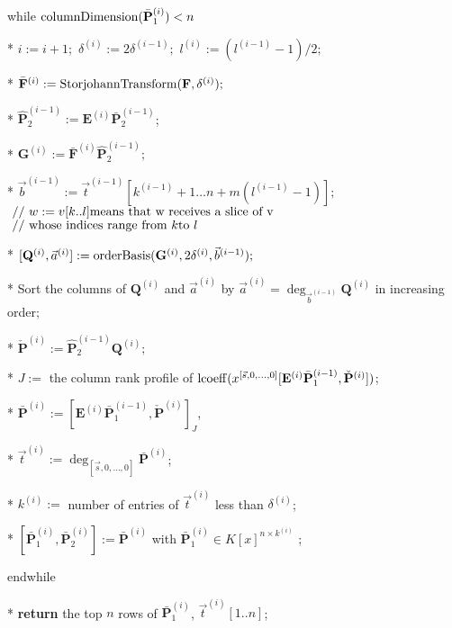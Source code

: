 \begin{algorithm}[t]
\begin{algor}[1]
\item [{{while}}] $\columnDimension(\bar{\mathbf{P}}_{1}^{\left(i\right)})<n$ 
\item [{{{*}}}] $i:=i+1;$ $\delta^{\left(i\right)}:=2\delta^{\left(i-1\right)};$
$l^{\left(i\right)}:=(l^{\left(i-1\right)}-1)/2;$ 
\item [{{{*}}}] $\bar{\mathbf{F}}^{\left(i\right)}:=\StorjohannTransform(\mathbf{F},\delta^{\left(i\right)});$ 
\item [{{{*}}}] $\hat{\mathbf{P}}_{2}^{\left(i-1\right)}:=\mathbf{E}^{\left(i\right)}\bar{\mathbf{P}}_{2}^{\left(i-1\right)}$;
\item [{{{*}}}] \label{line:matrixProduct1}$\mathbf{G}^{\left(i\right)}:=\bar{\mathbf{F}}^{\left(i\right)}\hat{\mathbf{P}}_{2}^{\left(i-1\right)};$ 
\item [{{{*}}}] $\vec{b}^{\left(i-1\right)}:=\vec{t}^{\left(i-1\right)}[k^{\left(i-1\right)}+1\dots n+m(l^{\left(i-1\right)}-1)];$
\\
$\mbox{ // \ensuremath{w:=v[k..l]}means that w receives a slice of v }$\\
$\mbox{ // whose indices range from \ensuremath{k}to \ensuremath{l}}$
\item [{{{*}}}] \label{line:orderBasisComputation}$[\mathbf{Q}^{\left(i\right)},\vec{a}^{\left(i\right)}]:=\mab(\mathbf{G}^{\left(i\right)},2\delta^{\left(i\right)},\vec{b}^{\left(i-1\right)});$ 
\item [{{{*}}}] Sort the columns of $\mathbf{Q}^{\left(i\right)}$ and
$\vec{a}^{\left(i\right)}$ by $\vec{a}^{\left(i\right)}=\deg_{\vec{b}^{\left(i-1\right)}}\mathbf{Q}^{\left(i\right)}$
in increasing order; 
\item [{{{*}}}] \label{line:matrixProduct2}$\check{\mathbf{P}}^{\left(i\right)}:=\hat{\mathbf{P}}_{2}^{\left(i-1\right)}\mathbf{Q}^{\left(i\right)};$ 
\item [{{{*}}}] \label{line:LSP}$J:=$ the column rank profile of $\operatorname{lcoeff}(x^{\left[\vec{s},0,\dots,0\right]}[\mathbf{E}^{\left(i\right)}\bar{\mathbf{P}}_{1}^{\left(i-1\right)},\check{\mathbf{P}}^{\left(i\right)}])$; 
\item [{{*}}] $\bar{\mathbf{P}}^{\left(i\right)}:=[\mathbf{E}^{\left(i\right)}\bar{\mathbf{P}}_{1}^{\left(i-1\right)},\check{\mathbf{P}}^{\left(i\right)}]_{J}$,
\item [{{*}}] $\vec{t}^{\left(i\right)}:=\deg_{\left[\vec{s},0,\dots,0\right]}\bar{\mathbf{P}}^{\left(i\right)}$; 
\item [{{{*}}}] $k^{\left(i\right)}:=$ number of entries of $\vec{t}^{\left(i\right)}$
less than $\delta^{\left(i\right)}$;
\item [{{*}}] $[\bar{\mathbf{P}}_{1}^{\left(i\right)},\bar{\mathbf{P}}_{2}^{\left(i\right)}]:=\bar{\mathbf{P}}^{\left(i\right)}$
with $\bar{\mathbf{P}}_{1}^{\left(i\right)}\in K\left[x\right]^{n\times k^{\left(i\right)}}$
;
\item [{{endwhile}}] ~ 
\item [{{{*}}}] \textbf{return} the top $n$ rows of $\bar{\mathbf{P}}_{1}^{\left(i\right)}$,
$\vec{t}^{\left(i\right)}\left[1..n\right]$; \end{algor}
\end{algorithm}

